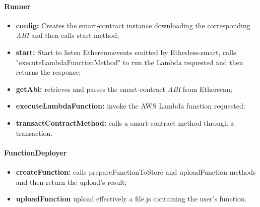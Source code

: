 \paragraph{Runner}
\begin{itemize}
	\item \textbf{config:} Creates the smart-contract instance downloading the corresponding \textit{ABI\glo} and then calls start method;
	\item \textbf{start:} Start to listen Ethereum\glo events emitted by Etherless-smart, calls "executeLambdaFunctionMethod" to run the Lambda requested and then returns the response;
	\item \textbf{getAbi:} retrieves and parses the smart-contract \textit{ABI\glo} from Etherscan;
	\item \textbf{executeLambdaFunction:} invoke the AWS Lambda function requested;
	\item \textbf{transactContractMethod:} calls a smart-contract method through a transaction.
\end{itemize}
\paragraph{FunctionDeployer}
\begin{itemize}
	\item \textbf{createFunction:} calls prepareFunctionToStore and uploadFunction methods and then return the upload's result;
	\item \textbf{uploadFunction} upload effectively a file.js containing the user's function.

\end{itemize}
